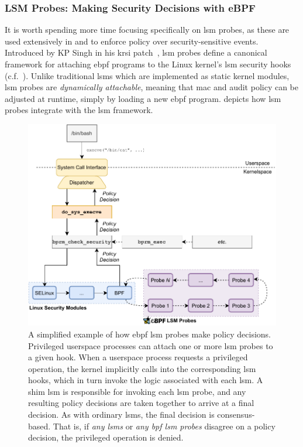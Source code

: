 \subsubsection*{LSM Probes: Making Security Decisions with eBPF}

It is worth spending more time focusing specifically on \gls{lsm} probes, as these are used
extensively in \bpfbox{} and \bpfcontain{} to enforce policy over security-sensitive
events. Introduced by KP Singh in his \gls{krsi}
patch~\cite{singh2019_krsi}, \gls{lsm} probes define a canonical framework for attaching \gls{ebpf}
programs to the Linux kernel's \gls{lsm} security hooks (c.f.~). Unlike
traditional \gls{lsm}s which are implemented as static kernel modules, \gls{lsm} probes are
\textit{dynamically attachable}, meaning that \gls{mac} and audit policy can be adjusted at
runtime, simply by loading a new \gls{ebpf} program.   depicts how \gls{lsm} probes
integrate with the \gls{lsm} framework.

\begin{figure}[htbp]
  \centering
  \includegraphics[width=0.8\linewidth]{figs/background/bpf-lsm.pdf}
  \caption[How eBPF LSM probes make policy decisions]{A simplified example of how \gls{ebpf} \gls{lsm} probes make policy decisions. Privileged userspace processes can attach one or more \gls{lsm} probes to a given hook. When a userspace process requests a privileged operation, the kernel implicitly calls into the corresponding \gls{lsm} hooks, which in turn invoke the logic associated with each \gls{lsm}. A shim \gls{lsm} is responsible for invoking each \gls{lsm} probe, and any resulting policy decisions are taken together to arrive at a final decision. As with ordinary \gls{lsm}s, the final decision is consensus-based. That is, if \textit{any \gls{lsm}s} or \textit{any \gls{bpf} \gls{lsm} probes} disagree on a policy decision, the privileged operation is denied.}%
  \label{fig:bpf-lsm}
\end{figure}

